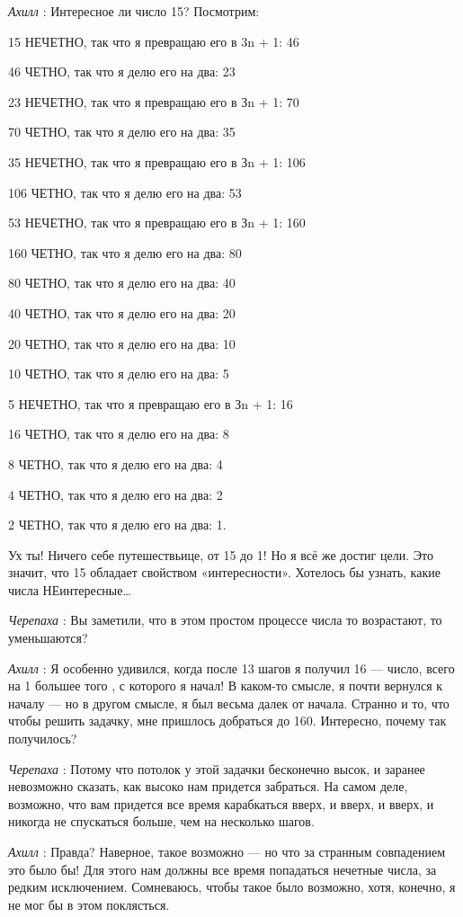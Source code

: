 \documentclass[../main.tex]{subfiles}
\begin{document}
\begin{dialogue}
\emph{Ахилл} : Интересное ли число 15? Посмотрим:

15 НЕЧЕТНО, так что я превращаю его в 3n + 1: 46

46 ЧЕТНО, так что я делю его на два: 23

23 НЕЧЕТНО, так что я превращаю его в Зn + 1: 70

70 ЧЕТНО, так что я делю его на два: 35

35 НЕЧЕТНО, так что я превращаю его в Зn + 1: 106

106 ЧЕТНО, так что я делю его на два: 53

53 НЕЧЕТНО, так что я превращаю его в Зn + 1: 160

160 ЧЕТНО, так что я делю его на два: 80

80 ЧЕТНО, так что я делю его на два: 40

40 ЧЕТНО, так что я делю его на два: 20

20 ЧЕТНО, так что я делю его на два: 10

10 ЧЕТНО, так что я делю его на два: 5

5 НЕЧЕТНО, так что я превращаю его в Зn + 1: 16

16 ЧЕТНО, так что я делю его на два: 8

8 ЧЕТНО, так что я делю его на два: 4

4 ЧЕТНО, так что я делю его на два: 2

2 ЧЕТНО, так что я делю его на два: 1.

Ух ты! Ничего себе путешествьице, от 15 до 1! Но я всё же достиг цели. Это значит, что 15 обладает свойством «интересности». Хотелось бы узнать, какие числа НЕинтересные\ldots{}

\emph{Черепаха} : Вы заметили, что в этом простом процессе числа то возрастают, то уменьшаются?

\emph{Ахилл} : Я особенно удивился, когда после 13 шагов я получил 16 --- число, всего на 1 большее того , с которого я начал! В каком-то смысле, я почти вернулся к началу --- но в другом смысле, я был весьма далек от начала. Странно и то, что чтобы решить задачку, мне пришлось добраться до 160. Интересно, почему так получилось?

\emph{Черепаха} : Потому что потолок у этой задачки бесконечно высок, и заранее невозможно сказать, как высоко нам придется забраться. На самом деле, возможно, что вам придется все время карабкаться вверх, и вверх, и вверх, и никогда не спускаться больше, чем на несколько шагов.

\emph{Ахилл} : Правда? Наверное, такое возможно --- но что за странным совпадением это было бы! Для этого нам должны все время попадаться нечетные числа, за редким исключением. Сомневаюсь, чтобы такое было возможно, хотя, конечно, я не мог бы в этом поклясться.


\end{dialogue}
\end{document}
